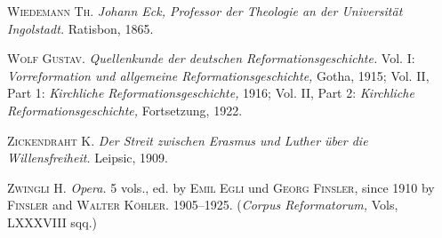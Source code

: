\textsc{Wiedemann Th.} \textit{Johann Eck, Professor der Theologie an der Universität
Ingolstadt.} Ratisbon, 1865.

\textsc{Wolf Gustav.} \textit{Quellenkunde der deutschen Reformationsgeschichte.}
Vol. I: \textit{Vorreformation und allgemeine Reformationsgeschichte,} Gotha, 1915;
Vol. II, Part 1: \textit{Kirchliche Reformationsgeschichte,} 1916;
Vol. II, Part 2: \textit{Kirchliche Reformationsgeschichte,} Fortsetzung, 1922.

\textsc{Zickendraht K.} \textit{Der Streit zwischen Erasmus und Luther über die Willensfreiheit.}
Leipsic, 1909.

\textsc{Zwingli H.} \textit{Opera.} 5 vols., ed. by \textsc{Emil Egli} und \textsc{Georg Finsler,} since
1910 by \textsc{Finsler} and \textsc{Walter Köhler}. 1905--1925. (\textit{Corpus Reformatorum,}
Vols, LXXXVIII sqq.)
